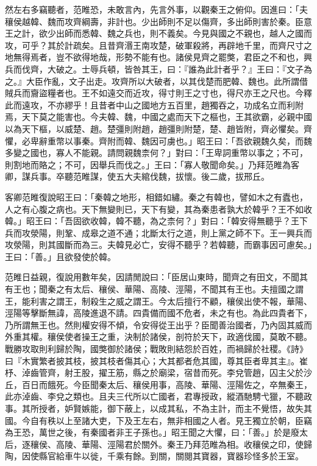 \begin{pinyinscope}
然左右多竊聽者，范睢恐，未敢言內，先言外事，以觀秦王之俯仰。因進曰：「夫穰侯越韓、魏而攻齊綱壽，非計也。少出師則不足以傷齊，多出師則害於秦。臣意王之計，欲少出師而悉韓、魏之兵也，則不義矣。今見與國之不親也，越人之國而攻，可乎？其於計疏矣。且昔齊湣王南攻楚，破軍殺將，再辟地千里，而齊尺寸之地無得焉者，豈不欲得地哉，形勢不能有也。諸侯見齊之罷獘，君臣之不和也，興兵而伐齊，大破之。士辱兵頓，皆咎其王，曰：『誰為此計者乎？』王曰：『文子為之。』大臣作亂，文子出走。攻齊所以大破者，以其伐楚而肥韓、魏也。此所謂借賊兵而齎盜糧者也。王不如遠交而近攻，得寸則王之寸也，得尺亦王之尺也。今釋此而遠攻，不亦繆乎！且昔者中山之國地方五百里，趙獨吞之，功成名立而利附焉，天下莫之能害也。今夫韓、魏，中國之處而天下之樞也，王其欲霸，必親中國以為天下樞，以威楚、趙。楚彊則附趙，趙彊則附楚，楚、趙皆附，齊必懼矣。齊懼，必卑辭重幣以事秦。齊附而韓、魏因可虜也。」昭王曰：「吾欲親魏久矣，而魏多變之國也，寡人不能親。請問親魏柰何？」對曰：「王卑詞重幣以事之；不可，則割地而賂之；不可，因舉兵而伐之。」王曰：「寡人敬聞命矣。」乃拜范睢為客卿，謀兵事。卒聽范睢謀，使五大夫綰伐魏，拔懷。後二歲，拔邢丘。

客卿范睢復說昭王曰：「秦韓之地形，相錯如繡。秦之有韓也，譬如木之有蠹也，人之有心腹之病也。天下無變則已，天下有變，其為秦患者孰大於韓乎？王不如收韓。」昭王曰：「吾固欲收韓，韓不聽，為之柰何？」對曰：「韓安得無聽乎？王下兵而攻滎陽，則鞏、成皋之道不通；北斷太行之道，則上黨之師不下。王一興兵而攻滎陽，則其國斷而為三。夫韓見必亡，安得不聽乎？若韓聽，而霸事因可慮矣。」王曰：「善。」且欲發使於韓。

范睢日益親，復說用數年矣，因請閒說曰：「臣居山東時，聞齊之有田文，不聞其有王也；聞秦之有太后、穰侯、華陽、高陵、涇陽，不聞其有王也。夫擅國之謂王，能利害之謂王，制殺生之威之謂王。今太后擅行不顧，穰侯出使不報，華陽、涇陽等擊斷無諱，高陵進退不請。四貴備而國不危者，未之有也。為此四貴者下，乃所謂無王也。然則權安得不傾，令安得從王出乎？臣聞善治國者，乃內固其威而外重其權。穰侯使者操王之重，決制於諸侯，剖符於天下，政適伐國，莫敢不聽。戰勝攻取則利歸於陶，國獘御於諸侯；戰敗則結怨於百姓，而禍歸於社稷。《詩》曰『木實繁者披其枝，披其枝者傷其心；大其都者危其國，尊其臣者卑其主』。崔杼、淖齒管齊，射王股，擢王筋，縣之於廟梁，宿昔而死。李兌管趙，囚主父於沙丘，百日而餓死。今臣聞秦太后、穰侯用事，高陵、華陽、涇陽佐之，卒無秦王，此亦淖齒、李兌之類也。且夫三代所以亡國者，君專授政，縱酒馳騁弋獵，不聽政事。其所授者，妒賢嫉能，御下蔽上，以成其私，不為主計，而主不覺悟，故失其國。今自有秩以上至諸大吏，下及王左右，無非相國之人者。見王獨立於朝，臣竊為王恐，萬世之後，有秦國者非王子孫也。」昭王聞之大懼，曰：「善。」於是廢太后，逐穰侯、高陵、華陽、涇陽君於關外。秦王乃拜范睢為相。收穰侯之印，使歸陶，因使縣官給車牛以徙，千乘有餘。到關，關閱其寶器，寶器珍怪多於王室。


\end{pinyinscope}
